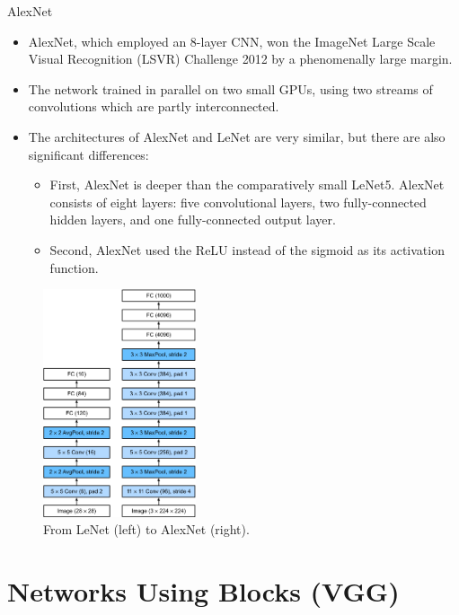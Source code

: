 \begin{vbframe}{AlexNet}
  \begin{itemize}
    \item AlexNet, which employed an 8-layer CNN, won the ImageNet Large Scale Visual Recognition (LSVR) Challenge 2012 by a phenomenally large margin.
    \item The network trained in parallel on two small GPUs, using two streams of convolutions which are partly interconnected.
    \item The architectures of AlexNet and LeNet are very similar, but there are also significant differences: 
       \begin{itemize}
          \item First, AlexNet is deeper than the comparatively small LeNet5. AlexNet consists of eight layers: five convolutional layers, two fully-connected hidden layers, and one fully-connected output layer. 
          \item Second, AlexNet used the ReLU instead of the sigmoid as its activation function. 
       \end{itemize}
  \end{itemize}
    \begin{figure}
        \centering
        \includegraphics[width=4.5cm]{plots/moderncnn/alexnet.png}
        \caption{From LeNet (left) to AlexNet (right).}
    \end{figure}
\end{vbframe}


\section{Networks Using Blocks (VGG)}

